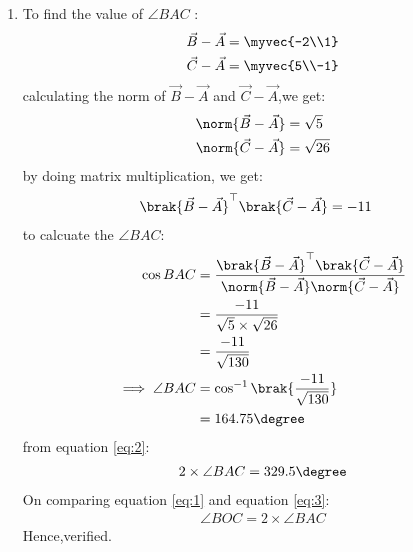 \documentclass[11pt]{book}
\begin{document}
\begin{enumerate}[label=\thesection.\arabic*.,ref=\thesection.\theenumi]
\begin{enumerate}
	\item To find  the value of $\angle{BAC}$ :
\begin{align}
\vec{B}-\vec{A} &= \myvec{-2\\1}\\
\vec{C}-\vec{A} &= \myvec{5\\-1}
\end{align}
calculating the norm of $\vec{B}-\vec{A}$ and $\vec{C}-\vec{A}$,we get:
\begin{align}
	\norm{\vec{B}-\vec{A}} &= \sqrt{5}\\
	\norm{\vec{C}-\vec{A}} &= \sqrt{26}
\end{align}
by doing matrix multiplication, we get:
\begin{align}
\brak{\vec{B}-\vec{A}}^{\top}\brak{\vec{C}-\vec{A}} &= -11
\end{align}
to calcuate the $\angle{BAC}$:
\begin{align}
\cos{BAC} &= \frac{\brak{\vec{B}-\vec{A}}^{\top}\brak{\vec{C}-\vec{A}}}{\norm{\vec{B}-\vec{A}}\norm{\vec{C}-\vec{A}}}\\
&= \frac{-11}{\sqrt{5}\times\sqrt{26}}\\
&= \frac{-11}{\sqrt{130}}\\
	\implies\angle{BAC} &= \cos^{-1}\brak{\frac{-11}{\sqrt{130}}}\\
&= 164.75\degree \label{eq:2}
\end{align}
from equation \eqref{eq:2}: 
\begin{align}
2\times\angle{BAC} = 329.5\degree \label{eq:3}
\end{align}
On comparing equation \eqref{eq:1} and equation \eqref{eq:3}:
\begin{align}
\angle{BOC} = 2\times\angle{BAC}
\end{align}
Hence,verified.
\end{enumerate}


\end{enumerate}
\end{document}
